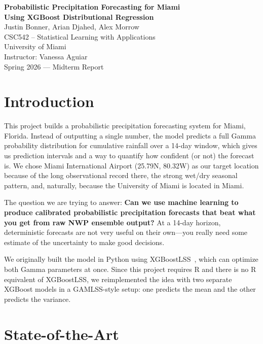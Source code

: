 \documentclass[11pt]{article}
\begin{document}
\begin{center}
    {\LARGE \textbf{Probabilistic Precipitation Forecasting for Miami\\Using XGBoost Distributional Regression}}\\[1.5em]
    {\large Justin Bonner, Arian Djahed, Alex Morrow}\\[0.5em]
    CSC542 -- Statistical Learning with Applications\\
    University of Miami\\
    Instructor: Vanessa Aguiar\\[0.5em]
    Spring 2026 --- Midterm Report
\end{center}
\vspace{1em}

\section{Introduction}

This project builds a probabilistic precipitation forecasting system for Miami, Florida. Instead of outputting a single number, the model predicts a full Gamma probability distribution for cumulative rainfall over a 14-day window, which gives us prediction intervals and a way to quantify how confident (or not) the forecast is. We chose Miami International Airport (25.79\textdegree N, 80.32\textdegree W) as our target location because of the long observational record there, the strong wet/dry seasonal pattern, and, naturally, because the University of Miami is located in Miami.

The question we are trying to answer: \textbf{Can we use machine learning to produce calibrated probabilistic precipitation forecasts that beat what you get from raw NWP ensemble output?} At a 14-day horizon, deterministic forecasts are not very useful on their own---you really need some estimate of the uncertainty to make good decisions.

We originally built the model in Python using XGBoostLSS~\citep{marz2022}, which can optimize both Gamma parameters at once. Since this project requires R and there is no R equivalent of XGBoostLSS, we reimplemented the idea with two separate XGBoost models in a GAMLSS-style setup: one predicts the mean and the other predicts the variance.

\section{State-of-the-Art}
\end{document}
